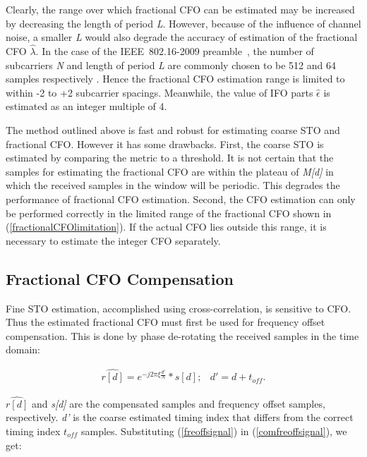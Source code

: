 Clearly, the range over which fractional CFO can be estimated may be increased by decreasing the length of period \emph{L}.
However, because of the influence of channel noise, a smaller \emph{L} would also degrade the accuracy of estimation of the fractional CFO $\hat{\lambda}$.
In the case of the IEEE~802.16-2009 preamble~\cite{IEEE80216}, the number of subcarriers \emph{N} and length of period \emph{L} are commonly chosen to be 512 and 64 samples respectively \cite{Kim2008}.
Hence the fractional CFO estimation range is limited to within -2 to +2 subcarrier spacings. Meanwhile, the value of IFO parts $\hat{\epsilon}$ is estimated as an integer multiple of 4.

The method outlined above is fast and robust for estimating coarse STO and fractional CFO.
However it has some drawbacks.
First, the coarse STO is estimated by comparing the metric to a threshold.
It is not certain that the samples for estimating the fractional CFO are within the plateau of \emph{M[d]} in which the received samples in the window will be periodic.
This degrades the performance of fractional CFO estimation.
Second, the CFO estimation can only be performed correctly in the limited range of the fractional CFO shown in (\ref{fractionalCFOlimitation}).
If the actual CFO lies outside this range, it is necessary to estimate the integer CFO separately.

\subsection{Fractional CFO Compensation}

Fine STO estimation, accomplished using cross-correlation, is sensitive to CFO.
Thus the estimated fractional CFO must first be used for frequency offset compensation.
This is done by phase de-rotating the received samples in the time domain:

\begin{eqnarray}
\label{comfreoffsignal}
\widehat{r[d]} =  e^{-j2\pi\xi \frac{d'}{N}}*s[d];  & d' = d + \mathit{t_{off}}.
\end{eqnarray}

$\widehat{r[d]}$ and \emph{s[d]} are the compensated samples and frequency offset samples, respectively. \emph{d'} is the coarse estimated timing index that differs from the correct timing index $\mathit{t_{off}}$ samples.
Substituting (\ref{freoffsignal}) in (\ref{comfreoffsignal}), we get:

